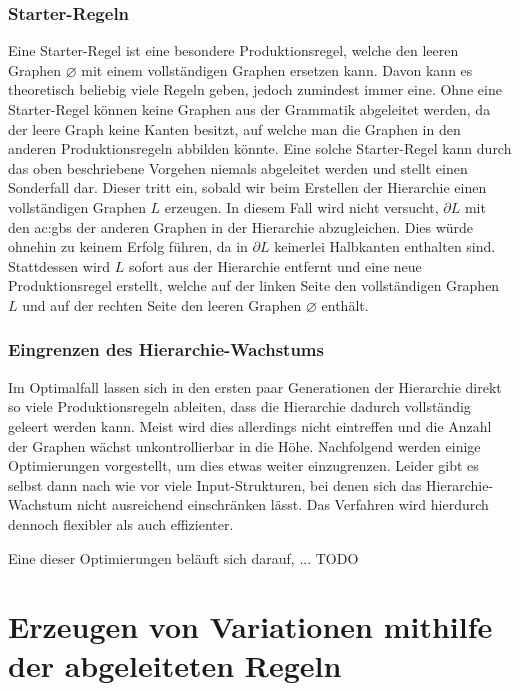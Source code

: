 \subsubsection{Starter-Regeln}
Eine Starter-Regel ist eine besondere Produktionsregel, welche den leeren Graphen \(\varnothing\) mit einem vollständigen Graphen ersetzen kann. Davon
kann es theoretisch beliebig viele Regeln geben, jedoch zumindest immer eine. Ohne eine Starter-Regel können keine Graphen aus der Grammatik abgeleitet werden,
da der leere Graph keine Kanten besitzt, auf welche man die Graphen in den anderen Produktionsregeln abbilden könnte. Eine solche Starter-Regel kann durch
das oben beschriebene Vorgehen niemals abgeleitet werden und stellt einen Sonderfall dar. Dieser tritt ein, sobald wir beim Erstellen der Hierarchie
einen vollständigen Graphen \(L\) erzeugen. In diesem Fall wird nicht versucht, \(\partial L\) mit den \gls{ac:gbs} der anderen Graphen in der Hierarchie
abzugleichen. Dies würde ohnehin zu keinem Erfolg führen, da in \(\partial L\) keinerlei Halbkanten enthalten sind. Stattdessen wird \(L\) sofort aus der
Hierarchie entfernt und eine neue Produktionsregel erstellt, welche auf der linken Seite den vollständigen Graphen \(L\) und auf der rechten Seite den
leeren Graphen \(\varnothing\) enthält.

\subsubsection{Eingrenzen des Hierarchie-Wachstums}
Im Optimalfall lassen sich in den ersten paar Generationen der Hierarchie direkt so viele Produktionsregeln ableiten, dass die Hierarchie dadurch vollständig
geleert werden kann. Meist wird dies allerdings nicht eintreffen und die Anzahl der Graphen wächst unkontrollierbar in die Höhe. Nachfolgend werden einige
Optimierungen vorgestellt, um dies etwas weiter einzugrenzen. Leider gibt es selbst dann nach wie vor viele Input-Strukturen, bei denen sich das
Hierarchie-Wachstum nicht ausreichend einschränken lässt. Das Verfahren wird hierdurch dennoch flexibler als auch effizienter.

Eine dieser Optimierungen beläuft sich darauf, ... TODO



\section{Erzeugen von Variationen mithilfe der abgeleiteten Regeln}
